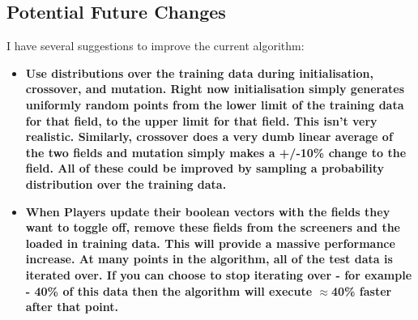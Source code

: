 \subsection{Potential Future Changes}
I have several suggestions to improve the current algorithm:

\begin{itemize}
    \item \bf Use distributions over the training data during initialisation, crossover, and mutation. \rm Right now initialisation simply generates uniformly random points from the lower limit of the training data for that field, to the upper limit for that field. This isn't very realistic. Similarly, crossover does a very dumb linear average of the two fields and mutation simply makes a +/-10\% change to the field. All of these could be improved by sampling a probability distribution over the training data.
    \item \bf When Players update their boolean vectors with the fields they want to toggle off, remove these fields from the screeners and the loaded in training data. \rm This will provide a massive performance increase. At many points in the algorithm, all of the test data is iterated over. If you can choose to stop iterating over - for example - 40\% of this data then the algorithm will execute $\approx$40\% faster after that point.
\end{itemize}
